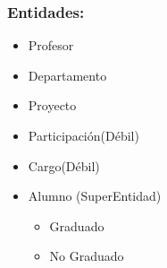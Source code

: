 \subsubsection*{Entidades:}
\begin{itemize}
    \item Profesor
    \item Departamento
    \item Proyecto
    \item Participación(Débil)
    \item Cargo(Débil)
    \item Alumno (SuperEntidad)
    \begin{itemize}
        \item Graduado
        \item No Graduado
    \end{itemize}
\end{itemize}
